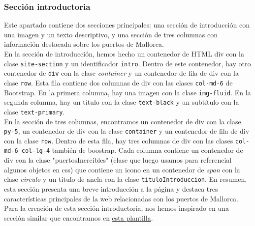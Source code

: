 \documentclass{article}
\begin{document}
\subsubsection{Sección introductoria}
Este apartado contiene dos secciones principales: una sección de introducción con una imagen y un texto descriptivo, y una sección de tres columnas con información destacada sobre los puertos de Mallorca.\\

\noindent En la sección de introducción, hemos hecho un contenedor de HTML div con la clase \texttt{site-section} y un identificador \texttt{intro}. Dentro de este contenedor, hay otro contenedor de \texttt{div} con la clase \textit{container} y un contenedor de fila de div con la clase \texttt{row}. Esta fila contiene dos columnas de div con las clases \texttt{col-md-6} de Bootstrap. En la primera columna, hay una imagen con la clase \texttt{img-fluid}. En la segunda columna, hay un título con la clase \texttt{text-black} y un subtítulo con la clase \texttt{text-primary}.\\

\noindent En la sección de tres columnas, encontramos un contenedor de div con la clase \texttt{py-5}, un contenedor de div con la clase \texttt{container} y un contenedor de fila de div con la clase \texttt{row}. Dentro de esta fila, hay tres columnas de div con las clases \texttt{col-md-6 col-lg-4} también de boostrap. Cada columna contiene un contenedor de div con la clase "puertosIncreibles" (clase que luego usamos para referencial algunos objetos en css) que contiene un icono en un contenedor de \textit{span} con la clase \textit{circulo} y un título de ancla con la clase \texttt{tituloIntroduccion}. En resumen, esta sección presenta una breve introducción a la página y destaca tres características principales de la web relacionadas con los puertos de Mallorca.\\

\noindent Para la creación de esta sección introductoria, nos hemos inspirado en una sección similar que encontramos en \href{https://themewagon.github.io/waterboat/}{esta plantilla}.
\end{document}
